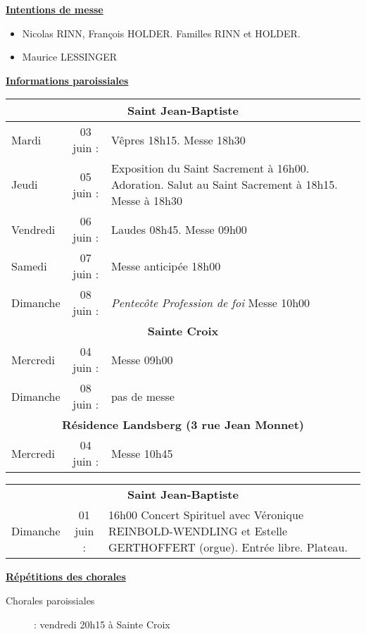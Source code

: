 \documentclass[11pt,a4paper]{article}
\newcommand{\NewsItem}[1]{%
\vspace{3pt}
\underline{\textbf{#1}}
		  }
\begin{document}
\newpage


\NewsItem{Intentions de messe}
\begin{itemize}
\item[\Cross]
Nicolas RINN, François HOLDER. Familles RINN et HOLDER.
\item[\Cross]
Maurice LESSINGER
\end{itemize}

\NewsItem{Informations paroissiales}

\begin{tabular} {lcp{8cm}}
\multicolumn{3}{c}{\textbf{Saint Jean-Baptiste} } \\ \hline
Mardi    & 03 juin : & Vêpres 18h15. Messe 18h30 \\ \hline
Jeudi    & 05 juin : & 
Exposition du Saint Sacrement à 16h00. Adoration. Salut au Saint Sacrement à 18h15. Messe à 18h30 
 \\ \hline
Vendredi & 06 juin : & Laudes 08h45. Messe 09h00 \\ \hline
Samedi   & 07 juin : & Messe anticipée 18h00 \\ \hline
Dimanche & 08 juin : & \emph{Pentecôte} \textit{Profession de foi} Messe 10h00 \\ \hline
\multicolumn{3}{c}{\textbf{Sainte Croix} } \\ \hline
Mercredi & 04 juin : & Messe 09h00 \\ \hline
Dimanche & 08 juin : & pas de messe \\ \hline
\multicolumn{3}{c}{\textbf{Résidence Landsberg (3 rue Jean Monnet)} } \\ \hline
Mercredi & 04 juin : & Messe 10h45 \\ \hline
\end{tabular}

\begin{framed}
\begin{tabular} {lcp{8cm}}
\multicolumn{3}{c}{\textbf{Saint Jean-Baptiste} } \\
Dimanche & 01 juin : & 16h00 Concert Spirituel avec Véronique REINBOLD-WENDLING et Estelle GERTHOFFERT (orgue). Entrée libre. Plateau.
\end{tabular}
\end{framed}


\NewsItem{Répétitions des chorales}
\begin{description}
\item[Chorales paroissiales] : vendredi 20h15 à Sainte Croix
\end{description}
\end{document}

